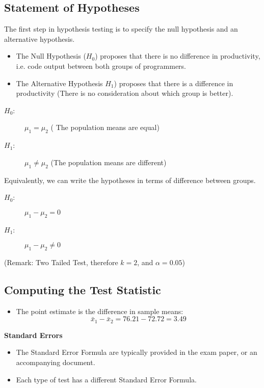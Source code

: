 \documentclass[a4paper,12pt]{article}
\begin{document}
\subsection*{Statement of Hypotheses}
\noindent The first step in hypothesis testing is to specify the null hypothesis and an alternative hypothesis.
\begin{itemize}
    \item The Null Hypothesis ($H_0$) proposes that there is no difference in productivity, i.e. code output  between both groups of programmers.
    \item The Alternative Hypothesis $H_1$) proposes that there is a difference in productivity (There is no consideration about which group is better).
\end{itemize}
\begin{description}
\item[$H_0$:] $\mu_1 = \mu_2$ ( The population means are equal)
\item[$H_1$:] $\mu_1 \neq \mu_2$ (The population means are different)
\end{description}

\noindent Equivalently, we can write the hypotheses in terms of difference between groups.
\begin{description}
\item[$H_0$:] $\mu_1 - \mu_2 = 0$ 
\item[$H_1$:] $\mu_1 - \mu_2\neq   0$ 
\end{description}



\noindent (Remark: Two Tailed Test, therefore $k = 2$, and $\alpha = 0.05$)
\newpage
\subsection*{Computing the Test Statistic}


\begin{itemize}
    \item The point estimate is the difference in sample means:
    \[ \bar{x}_1 - \bar{x}_2 = 76.21 - 72.72 = 3.49\]
\end{itemize}
\noindent \textbf{Standard Errors}
\begin{itemize}
    \item The Standard Error Formula are typically provided in the exam paper, or an accompanying document.
    \item Each type of test has a different Standard Error Formula.
\end{itemize}
\end{document}
